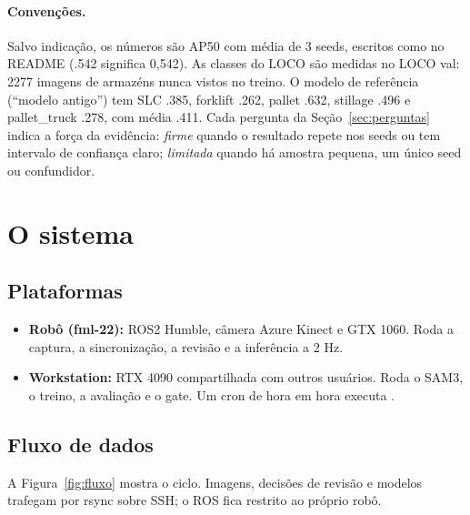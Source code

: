 \documentclass[11pt,a4paper]{article}
\begin{document}
\paragraph{Convenções.} Salvo indicação, os números são AP50 com média de 3
seeds, escritos como no README (.542 significa 0,542). As classes do LOCO são
medidas no LOCO val: 2277 imagens de armazéns nunca vistos no treino. O modelo
de referência (``modelo antigo'') tem SLC .385, forklift .262, pallet .632,
stillage .496 e pallet\_truck .278, com média .411. Cada pergunta da
Seção~\ref{sec:perguntas} indica a força da evidência: \emph{firme} quando o
resultado repete nos seeds ou tem intervalo de confiança claro; \emph{limitada}
quando há amostra pequena, um único seed ou confundidor.

\section{O sistema}

\subsection{Plataformas}

\begin{itemize}
  \item \textbf{Robô (fml-22):} ROS2 Humble, câmera Azure Kinect e GTX 1060.
    Roda a captura, a sincronização, a revisão e a inferência a 2 Hz.
  \item \textbf{Workstation:} RTX 4090 compartilhada com outros usuários. Roda
    o SAM3, o treino, a avaliação e o gate. Um cron de hora em hora executa
    .
\end{itemize}

\subsection{Fluxo de dados}

A Figura~\ref{fig:fluxo} mostra o ciclo. Imagens, decisões de revisão e modelos
trafegam por rsync sobre SSH; o ROS fica restrito ao próprio robô.
\end{document}
